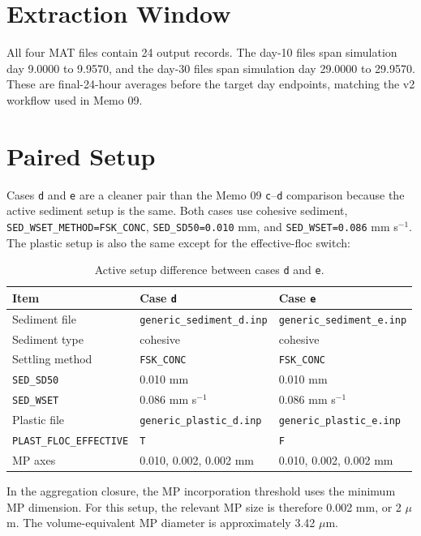 \documentclass[11pt]{article}
\begin{document}
\section*{Extraction Window}

All four MAT files contain 24 output records.  The day-10 files span
simulation day 9.0000 to 9.9570, and the day-30 files span simulation day
29.0000 to 29.9570.  These are final-24-hour averages before the target day
endpoints, matching the v2 workflow used in Memo 09.

\section*{Paired Setup}

Cases \texttt{d} and \texttt{e} are a cleaner pair than the Memo 09
\texttt{c}--\texttt{d} comparison because the active sediment setup is the
same.  Both cases use cohesive sediment, \texttt{SED\_WSET\_METHOD=FSK\_CONC},
\texttt{SED\_SD50=0.010} mm, and \texttt{SED\_WSET=0.086} mm s$^{-1}$.
The plastic setup is also the same except for the effective-floc switch:

\begin{table}[h]
\centering
\caption{Active setup difference between cases \texttt{d} and \texttt{e}.}
\begin{tabular}{lll}
\toprule
Item & Case \texttt{d} & Case \texttt{e} \\
\midrule
Sediment file & \texttt{generic\_sediment\_d.inp} & \texttt{generic\_sediment\_e.inp} \\
Sediment type & cohesive & cohesive \\
Settling method & \texttt{FSK\_CONC} & \texttt{FSK\_CONC} \\
\texttt{SED\_SD50} & 0.010 mm & 0.010 mm \\
\texttt{SED\_WSET} & 0.086 mm s$^{-1}$ & 0.086 mm s$^{-1}$ \\
Plastic file & \texttt{generic\_plastic\_d.inp} & \texttt{generic\_plastic\_e.inp} \\
\texttt{PLAST\_FLOC\_EFFECTIVE} & \texttt{T} & \texttt{F} \\
MP axes & 0.010, 0.002, 0.002 mm & 0.010, 0.002, 0.002 mm \\
\bottomrule
\end{tabular}
\end{table}

In the aggregation closure, the MP incorporation threshold uses the minimum MP
dimension.  For this setup, the relevant MP size is therefore 0.002 mm, or
2 $\mu$m.  The volume-equivalent MP diameter is approximately 3.42 $\mu$m.
\end{document}
